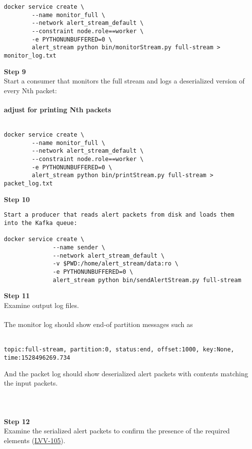 \begin{verbatim}
docker service create \
        --name monitor_full \
        --network alert_stream_default \
        --constraint node.role==worker \
        -e PYTHONUNBUFFERED=0 \
        alert_stream python bin/monitorStream.py full-stream > monitor_log.txt
\end{verbatim}

\textbf{Step 9}\\
Start a consumer that monitors the full stream and logs a deserialized
version of every Nth packet:\\
~\\
\textbf{adjust for printing Nth packets}\\
~\\

\begin{verbatim}
docker service create \
        --name monitor_full \
        --network alert_stream_default \
        --constraint node.role==worker \
        -e PYTHONUNBUFFERED=0 \
        alert_stream python bin/printStream.py full-stream > packet_log.txt
\end{verbatim}

\textbf{Step 10}\\

\begin{verbatim}
Start a producer that reads alert packets from disk and loads them into the Kafka queue:

docker service create \
              --name sender \
              --network alert_stream_default \
              -v $PWD:/home/alert_stream/data:ro \
              -e PYTHONUNBUFFERED=0 \
              alert_stream python bin/sendAlertStream.py full-stream
\end{verbatim}

\textbf{Step 11}\\
Examine output log files.\\
~\\
The monitor log should show end-of partition messages such as\\
~\\

\begin{verbatim}
topic:full-stream, partition:0, status:end, offset:1000, key:None, time:1528496269.734
\end{verbatim}

And the packet log should show deserialized alert packets with contents
matching the input packets.\\
~\\
~\\
~\\
\textbf{Step 12}\\
Examine the serialized alert packets to confirm the presence of the
required elements
(\href{https://jira.lsstcorp.org/browse/LVV-105}{LVV-105}).~ ~ ~ ~ ~ ~ ~
~ ~ ~ ~ ~ ~ ~ ~ ~ ~\\
~\\

